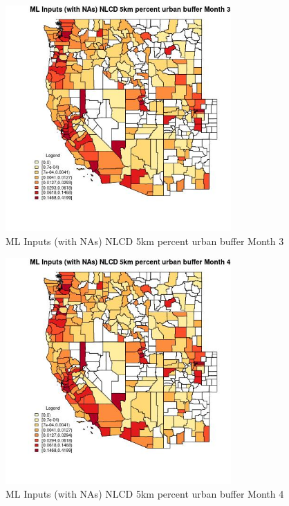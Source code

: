 \begin{figure} 
\centering  
\includegraphics[width=0.77\textwidth]{Code_Outputs/Report_ML_input_PM25_Step4_part_e_de_duplicated_aves_compiled_2019-05-21wNAs_CountyNLCD_5km_percent_urban_buffermedianMonth3.jpg} 
\caption{\label{fig:Report_ML_input_PM25_Step4_part_e_de_duplicated_aves_compiled_2019-05-21wNAsCountyNLCD_5km_percent_urban_buffermedianMonth3}ML Inputs (with NAs) NLCD 5km percent urban buffer Month 3} 
\end{figure} 
 

\begin{figure} 
\centering  
\includegraphics[width=0.77\textwidth]{Code_Outputs/Report_ML_input_PM25_Step4_part_e_de_duplicated_aves_compiled_2019-05-21wNAs_CountyNLCD_5km_percent_urban_buffermedianMonth4.jpg} 
\caption{\label{fig:Report_ML_input_PM25_Step4_part_e_de_duplicated_aves_compiled_2019-05-21wNAsCountyNLCD_5km_percent_urban_buffermedianMonth4}ML Inputs (with NAs) NLCD 5km percent urban buffer Month 4} 
\end{figure} 
 

